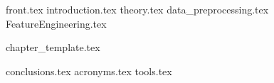 \documentclass[10pt,twoside,openany, final]{report}
\begin{document}
{front.tex}
\setcounter{page}{0}
\listoftodos %
\tableofcontents
\setcounter{page}{0}
{introduction.tex}
{theory.tex}
{data_preprocessing.tex}
{FeatureEngineering.tex}



{chapter_template.tex}

{conclusions.tex}
\appendix
{acronyms.tex}
{tools.tex}

\printbibliography
{}
\end{document}
